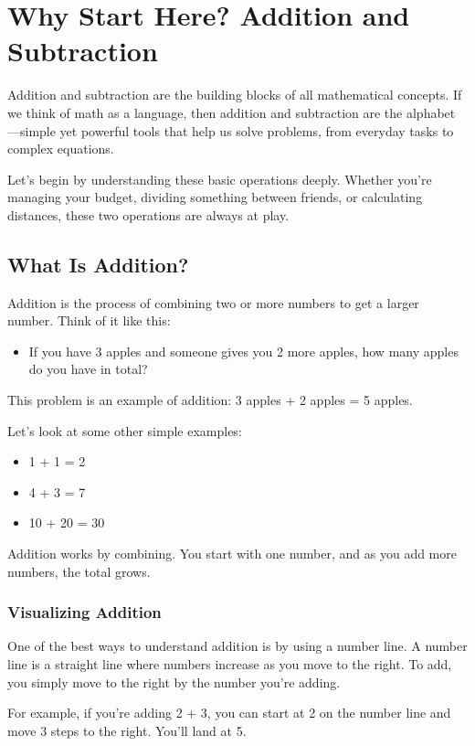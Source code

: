\chapter{Why Start Here? Addition and Subtraction}

Addition and subtraction are the building blocks of all mathematical concepts. If we think of math as a language, then addition and subtraction are the alphabet—simple yet powerful tools that help us solve problems, from everyday tasks to complex equations.

Let’s begin by understanding these basic operations deeply. Whether you’re managing your budget, dividing something between friends, or calculating distances, these two operations are always at play.


\section{What Is Addition?}
Addition is the process of combining two or more numbers to get a larger number. Think of it like this:
\begin{itemize}
    \item If you have 3 apples and someone gives you 2 more apples, how many apples do you have in total?
\end{itemize}
This problem is an example of addition: 3 apples + 2 apples = 5 apples.

Let’s look at some other simple examples:
\begin{itemize}
    \item 1 + 1 = 2
    \item 4 + 3 = 7
    \item 10 + 20 = 30
\end{itemize}

Addition works by combining. You start with one number, and as you add more numbers, the total grows.

\subsection{Visualizing Addition}
One of the best ways to understand addition is by using a number line. A number line is a straight line where numbers increase as you move to the right. To add, you simply move to the right by the number you're adding.

For example, if you’re adding 2 + 3, you can start at 2 on the number line and move 3 steps to the right. You’ll land at 5.

\begin{center}
\end{center}

